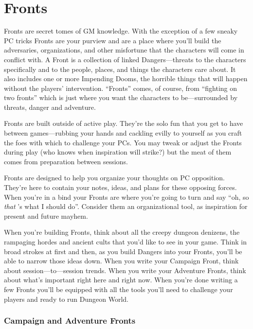 \chapter{Fronts}
  
 



Fronts are secret tomes of GM knowledge. With the exception of a few sneaky PC tricks Fronts are your purview and are a place where you’ll build the adversaries, organizations, and other misfortune that the characters will come in conflict with. A Front is a collection of linked Dangers—threats to the characters specifically and to the people, places, and things the characters care about. It also includes one or more Impending Dooms, the horrible things that will happen without the players' intervention. “Fronts” comes, of course, from “fighting on two fronts” which is just where you want the characters to be—surrounded by threats, danger and adventure.

 

Fronts are built outside of active play. They’re the solo fun that you get to have between games—rubbing your hands and cackling evilly to yourself as you craft the foes with which to challenge your PCs. You may tweak or adjust the Fronts during play (who knows when inspiration will strike?) but the meat of them comes from preparation between sessions.

 

Fronts are designed to help you organize your thoughts on PC opposition. They’re here to contain your notes, ideas, and plans for these opposing forces. When you’re in a bind your Fronts are where you’re going to turn and say “oh, so {\em that} ’s what I should do”. Consider them an organizational tool, as inspiration for present and future mayhem.

 

When you’re building Fronts, think about all the creepy dungeon denizens, the rampaging hordes and ancient cults that you’d like to see in your game. Think in broad strokes at first and then, as you build Dangers into your Fronts, you’ll be able to narrow those ideas down. When you write your Campaign Front, think about session—to—session trends. When you write your Adventure Fronts, think about what’s important right here and right now. When you’re done writing a few Fronts you’ll be equipped with all the tools you’ll need to challenge your players and ready to run Dungeon World.

 
\subsection{Campaign and Adventure Fronts}     
 

